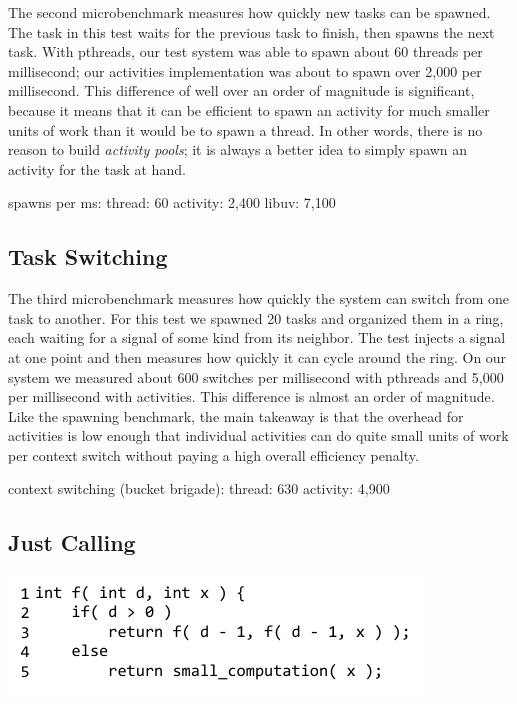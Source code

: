 \documentclass[10pt,preprint]{sigplanconf}
\begin{document}

The second microbenchmark measures how quickly new tasks can be spawned.
The task in this test waits for the previous task to finish, then spawns the next task.
With pthreads, our test system was able to spawn about 60 threads per millisecond; our activities implementation was about to spawn over 2,000 per millisecond.
This difference of well over an order of magnitude is significant, because it means that it can be efficient to spawn an activity for much smaller units of work than it would be to spawn a thread.
In other words, there is no reason to build \emph{activity pools}; it is always a better idea to simply spawn an activity for the task at hand.

spawns per ms: thread: 60 activity: 2,400 libuv: 7,100

\subsection{Task Switching}

The third microbenchmark measures how quickly the system can switch from one task to another.
For this test we spawned 20 tasks and organized them in a ring, each waiting for a signal of some kind from its neighbor.
The test injects a signal at one point and then measures how quickly it can cycle around the ring.
On our system we measured about 600 switches per millisecond with pthreads and 5,000 per millisecond with activities.
This difference is almost an order of magnitude.
Like the spawning benchmark, the main takeaway is that the overhead for activities is low enough that individual activities can do quite small units of work per context switch without paying a high overall efficiency penalty.

context switching (bucket brigade): thread: 630  activity: 4,900

\subsection{Just Calling}

{\raggedleft \includegraphics{just_calling_benchmark}}
\end{document}
